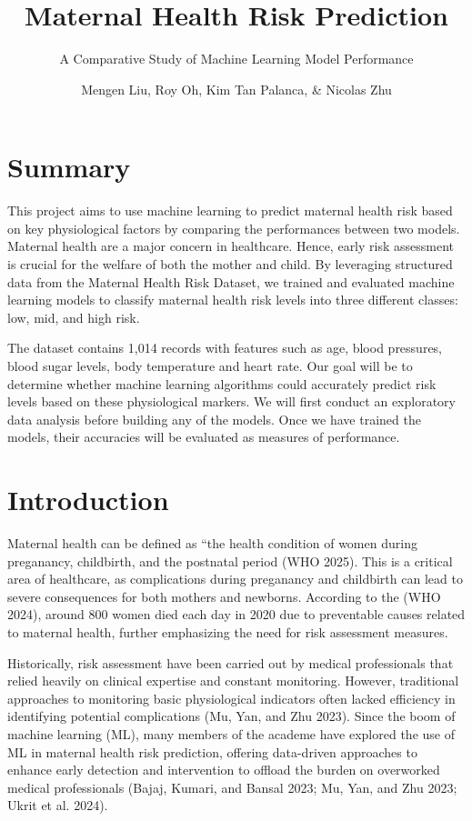 \documentclass[
  letterpaper,
  DIV=11,
  numbers=noendperiod]{scrartcl}
\title{Maternal Health Risk Prediction}
\subtitle{A Comparative Study of Machine Learning Model Performance}
\author{Mengen Liu, Roy Oh, Kim Tan Palanca, \& Nicolas Zhu}
\date{}
\begin{document}
\maketitle


\section{Summary}\label{summary}

This project aims to use machine learning to predict maternal health
risk based on key physiological factors by comparing the performances
between two models. Maternal health are a major concern in healthcare.
Hence, early risk assessment is crucial for the welfare of both the
mother and child. By leveraging structured data from the Maternal Health
Risk Dataset, we trained and evaluated machine learning models to
classify maternal health risk levels into three different classes: low,
mid, and high risk.

The dataset contains 1,014 records with features such as age, blood
pressures, blood sugar levels, body temperature and heart rate. Our goal
will be to determine whether machine learning algorithms could
accurately predict risk levels based on these physiological markers. We
will first conduct an exploratory data analysis before building any of
the models. Once we have trained the models, their accuracies will be
evaluated as measures of performance.

\section{Introduction}\label{introduction}

Maternal health can be defined as ``the health condition of women during
preganancy, childbirth, and the postnatal period (WHO 2025). This is a
critical area of healthcare, as complications during preganancy and
childbirth can lead to severe consequences for both mothers and
newborns. According to the (WHO 2024), around 800 women died each day in
2020 due to preventable causes related to maternal health, further
emphasizing the need for risk assessment measures.

Historically, risk assessment have been carried out by medical
professionals that relied heavily on clinical expertise and constant
monitoring. However, traditional approaches to monitoring basic
physiological indicators often lacked efficiency in identifying
potential complications (Mu, Yan, and Zhu 2023). Since the boom of
machine learning (ML), many members of the academe have explored the use
of ML in maternal health risk prediction, offering data-driven
approaches to enhance early detection and intervention to offload the
burden on overworked medical professionals (Bajaj, Kumari, and Bansal
2023; Mu, Yan, and Zhu 2023; Ukrit et al. 2024).
\end{document}
